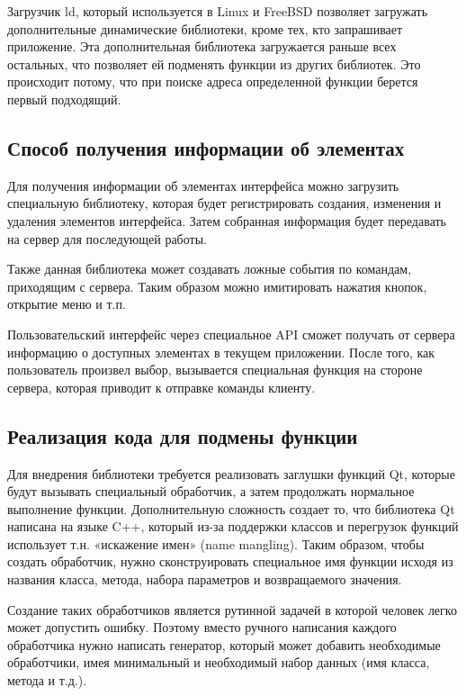 Загрузчик ld, который используется в Linux и FreeBSD позволяет загружать
дополнительные динамические библиотеки, кроме тех, кто запрашивает приложение.
Эта дополнительная библиотека загружается раньше всех остальных, что позволяет
ей подменять функции из других библиотек. Это происходит потому, что при поиске
адреса определенной функции берется первый подходящий.

\subsection{Способ получения информации об элементах}

Для получения информации об элементах интерфейса можно загрузить специальную
библиотеку, которая будет регистрировать создания, изменения и удаления
элементов интерфейса. Затем собранная информация будет передавать на сервер для
последующей работы.

Также данная библиотека может создавать ложные события по командам, приходящим с
сервера. Таким образом можно имитировать нажатия кнопок, открытие меню и т.п.

Пользовательский интерфейс через специальное API сможет получать от сервера
информацию о доступных элементах в текущем приложении. После того, как
пользователь произвел выбор, вызывается специальная функция на стороне сервера,
которая приводит к отправке команды клиенту.

\subsection{Реализация кода для подмены функции}

Для внедрения библиотеки требуется реализовать заглушки функций Qt, которые
будут вызывать специальный обработчик, а затем продолжать нормальное выполнение
функции. Дополнительную сложность создает то, что библиотека Qt написана на
языке C++, который из-за поддержки классов и перегрузок функций использует т.н.
«искажение имен» (name mangling). Таким образом, чтобы создать обработчик,
нужно сконструировать специальное имя функции исходя из названия класса,
метода, набора параметров и возвращаемого значения.

Создание таких обработчиков является рутинной задачей в которой человек легко
может допустить ошибку. Поэтому вместо ручного написания каждого обработчика
нужно написать генератор, который может добавить необходимые обработчики, имея
минимальный и необходимый набор данных (имя класса, метода и т.д.).

